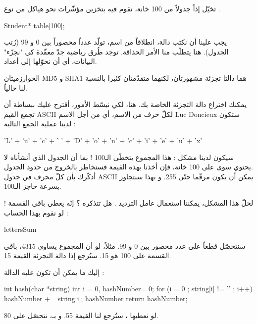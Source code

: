 تخيّل إذاً جدولاً من 100 خانة، تقوم فيه بتخزين مؤشّرات نحو هياكل من نوع
.

\begin{Csource}
Student* table[100];
\end{Csource}

يجب علينا أن نكتب دالة، انطلاقاً من اسم، تولّد عدداً محصوراً بين 0 و 99 (رُتب الجدول). هنا يتطلّب منا الأمر الحذاقة. توجد طُرق رياضية جدّ معقّدة كي "نجزّء" البيانات، أي أن نحوّلها إلى أعداد.

\begin{information}
الخوارزميتان
\textenglish{MD5}
و
\textenglish{SHA1}
هما دالتا تجزئة مشهورتان، لكنهما متقدّمتان كثيرا بالنسبة لنا حالياً.
\end{information}

يمكنك اختراع دالة التجزئة الخاصة بك. هنا، لكي نبسّط الأمور، أقترح عليك ببساطة أن تجمع القيم
\textenglish{ASCII}
لكلّ حرف من الاسم، أي من أجل الاسم
\textenglish{Luc Doncieux}
ستكون لدينا عملية الجمع التالية :

\begin{Csource}
'L' + 'u' + 'c' + ' ' + 'D' + 'o' + 'n' + 'c' + 'i' + 'e' + 'u' + 'x'
\end{Csource}

سيكون لدينا مشكل : هذا المجموع يتخطّى الـ100 ! بما أن الجدول الذي أنشأناه لا يحتوي سوى على 100 خانة، فإن أخذنا بهذه القيمة فسنخاطر بالخروج من حدود الجدول.\\
أذكّرك بأن كلّ محرف في جدول
\textenglish{ASCII}
يمكن أن يكون مرقّما حتّى 255. و بهذا سنتجاوز بسرعة حاجز الـ100.

لحلّ هذا المشكل، يمكننا استعمال عامل الترديد
\InlineCode{\%}.
هل تتذكره ؟ إنّه يعطي باقي القسمة ! لو نقوم بهذا الحساب :

\begin{Csource}
lettersSum %
\end{Csource}

سنتحصّل قطعاً على عدد محصور بين 0 و 99. مثلاً، لو أن المجموع يساوي 4315، باقي القسمة على 100 هو 15. ستُرجع إذا دالة التجزئة القيمة 15.

إليك ما يمكن أن تكون عليه الدالة :

\begin{Csource}
int hash(char *string)
{
	int i = 0, hashNumber= 0;
	for (i = 0 ; string[i] != '\0' ; i++)
	{
		hashNumber += string[i];
	}
	hashNumber %
	return hashNumber;
}
\end{Csource}

لو نعطيها
،
ستُرجع لنا القيمة 55. و بـ،
نتحصّل على 80.

